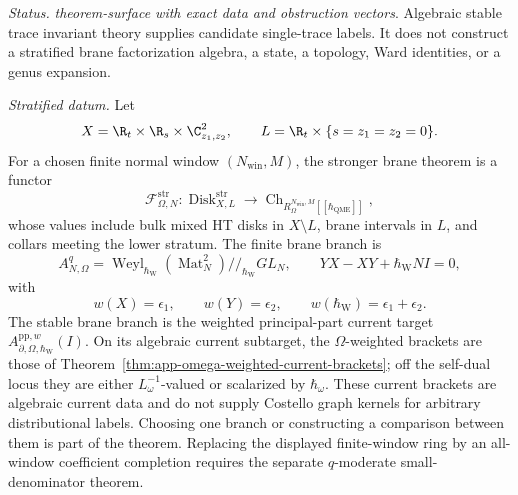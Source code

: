 \begin{stmt}\label{thm:lane-stratified-trace-physical-large-n}
  \emph{Status.} \emph{theorem-surface with exact data and obstruction
  vectors}.  Algebraic stable trace invariant theory supplies candidate
  single-trace labels.  It does not construct a stratified brane
  factorization algebra, a state, a topology, Ward identities, or a
  genus expansion.

  \emph{Stratified datum.} Let
  \[
    X=\R_t\times\R_s\times\C^2_{z_1,z_2},\qquad
    L=\R_t\times\{s=z_1=z_2=0\}.
  \]
  For a chosen finite normal window \((N_{\mathrm{win}},M)\), the
  stronger brane theorem is a functor
  \[
    \mathcal F^{\mathrm{str}}_{\Omega,N}\colon
    \operatorname{Disk}^{\mathrm{str}}_{X,L}
    \longrightarrow
    \operatorname{Ch}_{R_{\Omega}^{N_{\mathrm{win}},M}
    [[\hbar_{\mathrm{QME}}]]},
  \]
  whose values include bulk mixed HT disks in \(X\setminus L\), brane
  intervals in \(L\), and collars meeting the lower stratum.  The finite
  brane branch is
  \[
    A^q_{N,\Omega}
    =
    \operatorname{Weyl}_{\hbar_{\mathrm{W}}}
    (\operatorname{Mat}_N^2)//_{\hbar_{\mathrm{W}}} GL_N,
    \qquad
    YX-XY+\hbar_{\mathrm{W}}NI=0,
  \]
  with
  \[
    w(X)=\epsilon_1,\qquad
    w(Y)=\epsilon_2,\qquad
    w(\hbar_{\mathrm{W}})=\epsilon_1+\epsilon_2.
  \]
  The stable brane branch is the weighted principal-part current target
  \(A^{\mathrm{pp},w}_{\partial,\Omega,\hbar_{\mathrm{W}}}(I)\).  On its
  algebraic current subtarget, the \(\Omega\)-weighted brackets are those
  of Theorem~\ref{thm:app-omega-weighted-current-brackets}; off the
  self-dual locus they are either \(L_\omega^{-1}\)-valued or scalarized
  by \(\hbar_\omega\).  These current brackets are algebraic current data
  and do not supply Costello graph kernels for arbitrary distributional
  labels.  Choosing one branch or constructing a comparison between them
  is part of the theorem.  Replacing the displayed finite-window ring by
  an all-window coefficient completion requires the separate
  \(q\)-moderate small-denominator theorem.


\end{stmt}
